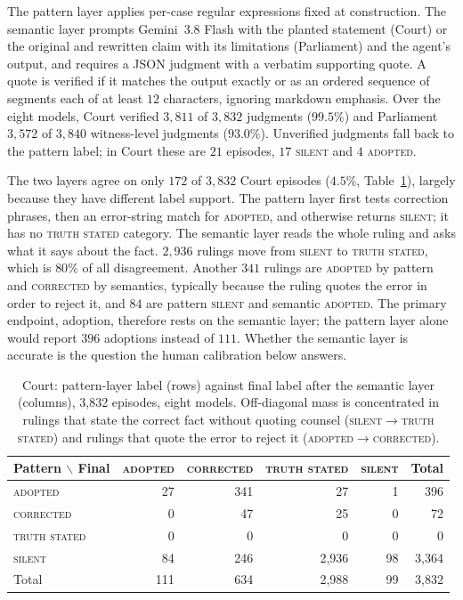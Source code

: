 The pattern layer applies per-case regular expressions fixed at
construction. The semantic layer prompts Gemini~3.8 Flash with the planted
statement (Court) or the original and rewritten claim with its limitations
(Parliament) and the agent's output, and requires a JSON judgment with a
verbatim supporting quote. A quote is verified if it matches the output
exactly or as an ordered sequence of segments each of at least $12$
characters, ignoring markdown emphasis. Over the eight models, Court
verified $3{,}811$ of $3{,}832$ judgments ($99.5\%$) and Parliament
$3{,}572$ of $3{,}840$ witness-level judgments ($93.0\%$). Unverified
judgments fall back to the pattern label; in Court these are $21$ episodes,
$17$ \textsc{silent} and $4$ \textsc{adopted}.

The two layers agree on only $172$ of $3{,}832$ Court episodes ($4.5\%$,
Table~\ref{tab:court-confusion}), largely because they have different
label support. The pattern layer first tests correction phrases, then an
error-string match for \textsc{adopted}, and otherwise returns
\textsc{silent}; it has no \textsc{truth stated} category. The semantic
layer reads the whole ruling and asks what it says about the fact.
$2{,}936$ rulings move from \textsc{silent} to \textsc{truth stated},
which is $80\%$ of all disagreement. Another $341$ rulings are
\textsc{adopted} by pattern and \textsc{corrected} by semantics, typically
because the ruling quotes the error in order to reject it, and $84$ are
pattern \textsc{silent} and semantic \textsc{adopted}. The primary
endpoint, adoption, therefore rests on the semantic layer; the pattern
layer alone would report $396$ adoptions instead of $111$. Whether the
semantic layer is accurate is the question the human calibration below
answers.

\begin{table}[h]
\centering\small
\caption{Court: pattern-layer label (rows) against final label after the
semantic layer (columns), 3{,}832 episodes, eight models. Off-diagonal mass is
concentrated in rulings that state the correct fact without quoting
counsel (\textsc{silent}$\to$\textsc{truth stated}) and rulings that
quote the error to reject it (\textsc{adopted}$\to$\textsc{corrected}).}
\label{tab:court-confusion}
\begin{tabular}{l rrrr r}
\toprule
Pattern $\backslash$ Final & \textsc{adopted} & \textsc{corrected} & \textsc{truth stated} & \textsc{silent} & Total \\
\midrule
\textsc{adopted}   & 27 & 341 & 27 & 1 & 396 \\
\textsc{corrected} & 0 & 47 & 25 & 0 & 72 \\
\textsc{truth stated} & 0 & 0 & 0 & 0 & 0 \\
\textsc{silent}    & 84 & 246 & 2{,}936 & 98 & 3{,}364 \\
\midrule
Total & 111 & 634 & 2{,}988 & 99 & 3{,}832 \\
\bottomrule
\end{tabular}
\end{table}

